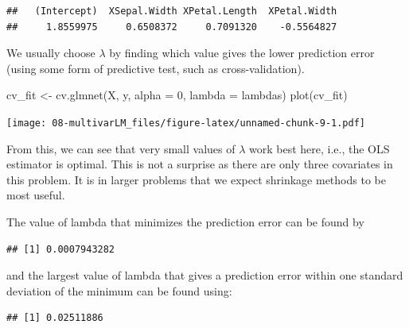 \documentclass[
]{book}
\newenvironment{Shaded}{\begin{snugshade}}{\end{snugshade}}
\newcommand{\AttributeTok}[1]{\textcolor[rgb]{0.77,0.63,0.00}{#1}}
\newcommand{\DecValTok}[1]{\textcolor[rgb]{0.00,0.00,0.81}{#1}}
\newcommand{\FloatTok}[1]{\textcolor[rgb]{0.00,0.00,0.81}{#1}}
\newcommand{\FunctionTok}[1]{\textcolor[rgb]{0.00,0.00,0.00}{#1}}
\newcommand{\NormalTok}[1]{#1}
\newcommand{\OtherTok}[1]{\textcolor[rgb]{0.56,0.35,0.01}{#1}}
\newcommand{\SpecialCharTok}[1]{\textcolor[rgb]{0.00,0.00,0.00}{#1}}
\theoremstyle{definition}
\theoremstyle{definition}
\theoremstyle{definition}
\theoremstyle{definition}
\theoremstyle{remark}
\begin{document}
\begin{verbatim}
##   (Intercept)  XSepal.Width XPetal.Length  XPetal.Width 
##     1.8559975     0.6508372     0.7091320    -0.5564827
\end{verbatim}

We usually choose \(\lambda\) by finding which value gives the lower prediction error (using some form of predictive test, such as cross-validation).

\begin{Shaded}
\begin{Highlighting}[]
\NormalTok{cv\_fit }\OtherTok{\textless{}{-}} \FunctionTok{cv.glmnet}\NormalTok{(X, y, }\AttributeTok{alpha =} \DecValTok{0}\NormalTok{, }\AttributeTok{lambda =}\NormalTok{ lambdas)}
\FunctionTok{plot}\NormalTok{(cv\_fit)}
\end{Highlighting}
\end{Shaded}

\texttt{[image: 08-multivarLM\_files/figure-latex/unnamed-chunk-9-1.pdf]}

From this, we can see that very small values of \(\lambda\) work best here, i.e., the OLS estimator is optimal. This is not a surprise as there are only three covariates in this problem. It is in larger problems that we expect shrinkage methods to be most useful.

The value of lambda that minimizes the prediction error can be found by

\begin{Shaded}
\end{Shaded}

\begin{verbatim}
## [1] 0.0007943282
\end{verbatim}

and the largest value of lambda that gives a prediction error within one standard deviation of the minimum can be found using:

\begin{Shaded}
\end{Shaded}

\begin{verbatim}
## [1] 0.02511886
\end{verbatim}
\end{document}
